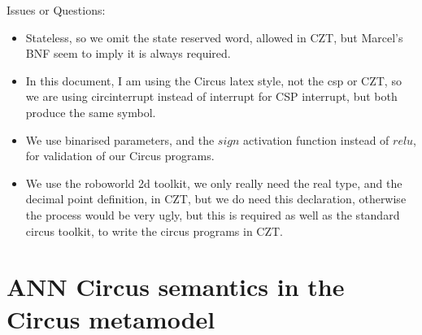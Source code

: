 \documentclass{article}
\begin{document}
Issues or Questions: 
\begin{itemize} 
  \item Stateless, so we omit the state reserved word, allowed in CZT, but Marcel's BNF seem to imply it is always required. 
  \item In this document, I am using the Circus latex style, not the csp or CZT, so we are using circinterrupt instead of interrupt for CSP interrupt, but both produce the same symbol. 
  \item We use binarised parameters, and the $sign$ activation function instead of $relu$, for validation of our Circus programs. 
  \item We use the roboworld 2d toolkit, we only really need the real type, and the decimal point definition, in CZT, but we do need this declaration, otherwise the process would be very ugly, but this is required as well as the standard circus toolkit, to write the circus programs in CZT. 
\end{itemize} 

\section{ANN Circus semantics in the Circus metamodel}
\end{document}
